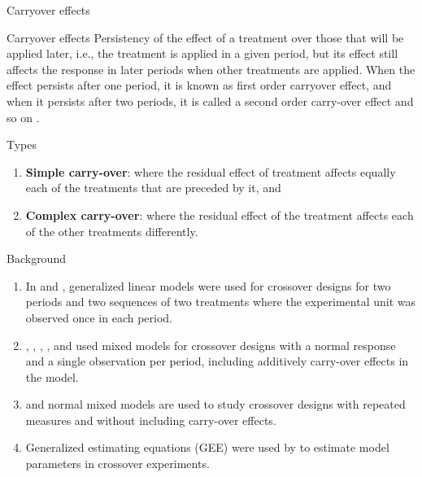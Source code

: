 \documentclass[t,9pt]{beamer}
\begin{document}
\begin{frame}[fragile]{Carryover effects }
\begin{block}{Carryover effects}
 Persistency of the effect of a treatment over those that will be applied later, i.e., the treatment is applied in a given period, but its effect still affects the response in later periods when other treatments are applied. When the effect persists after one period, it is known as first order carryover effect, and when it persists after two periods, it is called a second order carry-over effect and so on \citep{vegas2016crossover}.
\end{block}
\begin{block}{Types}
\begin{enumerate}
    \item  \textbf{Simple carry-over}: where the residual effect of treatment affects equally each of the treatments that are preceded by it, and 
    \item \textbf{Complex carry-over}: where the residual effect of the treatment affects each of the other treatments differently.
\end{enumerate}
\end{block}
\end{frame}
\begin{frame}[fragile]{Background}
\vfill
\begin{enumerate}
    \item In \cite{curtin2017meta} and \cite{li2018power},  generalized linear models were used for crossover designs for two periods and two sequences of two treatments where the experimental unit was observed once in each period.
    \item \cite{josephy2015within}, \cite{hao2015explicit}, \cite{lui2015test},  \cite{grayling2018blinded}, \cite{madeyski2018effect} and \cite{kitchenham2018corrections} used mixed models for crossover designs with a normal response and a single observation per period, including additively carry-over effects in the model. 
    \item \cite{diaz2013random} and \cite{for15} normal mixed models are used to study crossover designs with repeated measures and without including carry-over effects.
    \item  Generalized estimating equations (GEE) were used by \cite{jankar2020optimal} to estimate model parameters in crossover experiments. 
\end{enumerate}
\end{frame}
\end{document}
